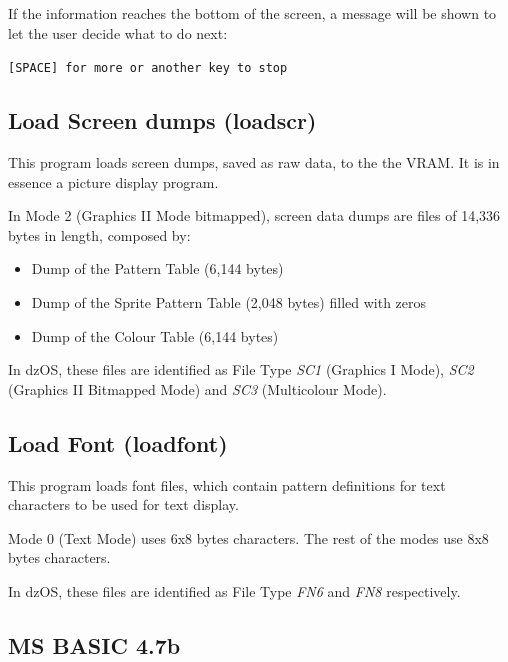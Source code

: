 \documentclass[a4paper,11pt]{article}
\begin{document}
    If the information reaches the bottom of the screen, a message will be shown
    to let the user decide what to do next:

    \hspace{1cm}\texttt{[SPACE] for more or another key to stop}

    \subsection{Load Screen dumps (loadscr)}
    This program loads screen dumps, saved as raw data, to the the VRAM. It is
    in essence a picture display program.

    In Mode 2 (Graphics II Mode bitmapped), screen data dumps are files of
    14,336 bytes in length, composed by:
    \begin{itemize}
        \item Dump of the Pattern Table (6,144 bytes)
        \item Dump of the Sprite Pattern Table (2,048 bytes) filled with zeros
        \item Dump of the Colour Table (6,144 bytes)
    \end{itemize}

    In dzOS, these files are identified as File Type \textit{SC1}
    (Graphics I Mode), \textit{SC2} (Graphics II Bitmapped Mode) and
    \textit{SC3} (Multicolour Mode).

    \subsection{Load Font (loadfont)}
    This program loads font files, which contain pattern definitions for text
    characters to be used for text display.

    Mode 0 (Text Mode) uses 6x8 bytes characters. The rest of the modes use 8x8
    bytes characters.
    
    In dzOS, these files are identified as File Type \textit{FN6} and
    \textit{FN8} respectively.

    \subsection{MS BASIC 4.7b}
    
\end{document}
